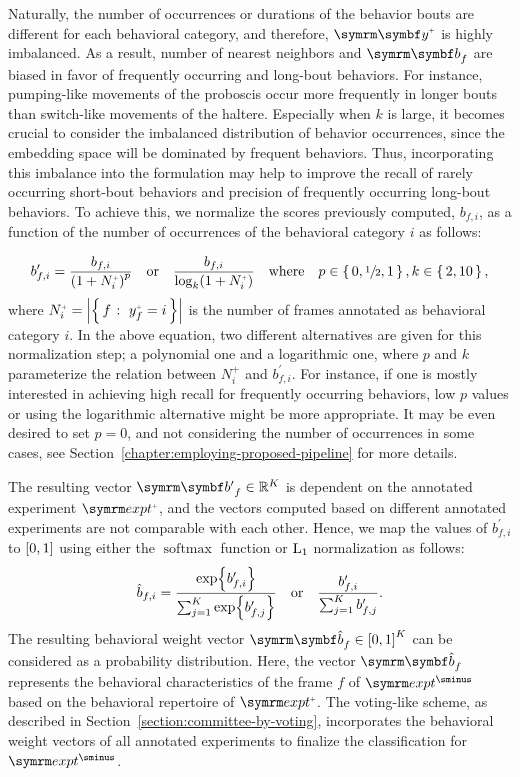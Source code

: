 Naturally, the number of occurrences or durations of the behavior bouts are different for each behavioral category, and therefore, $\Ann{\V{y}}$ is highly imbalanced.
As a result, number of nearest neighbors and $\V{b}_f$ are biased in favor of frequently occurring and long-bout behaviors.
For instance, pumping-like movements of the proboscis occur more frequently in longer bouts than switch-like movements of the haltere.
Especially when $k$ is large, it becomes crucial to consider the imbalanced distribution of behavior occurrences, since the embedding space will be dominated by frequent behaviors.
Thus, incorporating this imbalance into the formulation may help to improve the recall of rarely occurring short-bout behaviors and precision of frequently occurring long-bout behaviors.
To achieve this, we normalize the scores previously computed, $b_{f,i}$, as a function of the number of occurrences of the behavioral category $i$ as follows:

\begin{equation}
	b^\prime_{f,i} = \frac{b_{f,i}}{\rbr{1 + N^{\plus}_i}^p} \qbor \frac{b_{f,i}}{\log_k(1 + N^{\plus}_i)} \qbwhere p \in \set{0, \sfrac{1}{2}, 1}, k \in \set{2, 10},
\end{equation}
where $N^{\plus}_i = \card*{\Set{f}{y^{\plus}_f=i}}$ is the number of frames annotated as behavioral category $i$.
In the above equation, two different alternatives are given for this normalization step; a polynomial one and a logarithmic one, where $p$ and $k$ parameterize the relation between $N^{\plus}_i$ and $b^\prime_{f,i}$.
For instance, if one is mostly interested in achieving high recall for frequently occurring behaviors, low $p$ values or using the logarithmic alternative might be more appropriate.
It may be even desired to set $p=0$, and not considering the number of occurrences in some cases, see Section~\ref{chapter:employing-proposed-pipeline} for more details.

The resulting vector $\V{b^{\prime}}_f \in \reals^K$ is dependent on the annotated experiment $\exptAnn$, and the vectors computed based on different annotated experiments are not comparable with each other.
Hence, we map the values of $b^\prime_{f,i}$ to $\left[0,1\right]$ using either the $\operatorname {softmax}$ function or $\textnormal{L}_1$ normalization as follows:
\begin{equation}
	\hat{b}_{f,i} = \frac{\exp{b^\prime_{f,i}}}{\sum_{j=1}^{K} \exp{b^\prime_{f,j}}} \quad \textnormal{or} \quad \frac{b^\prime_{f,i}}{\sum_{j=1}^{K} b^\prime_{f,j}}.
\end{equation}
The resulting behavioral weight vector $\V{\hat{b}}_f \in \sqbr{0,1}^K$ can be considered as a probability distribution.
Here, the vector $\V{\hat{b}}_f$ represents the behavioral characteristics of the frame $f$ of $\exptUnann$ based on the behavioral repertoire of $\exptAnn$.
The voting-like scheme, as described in Section~\ref{section:committee-by-voting}, incorporates the behavioral weight vectors of all annotated experiments to finalize the classification for $\exptUnann$.

